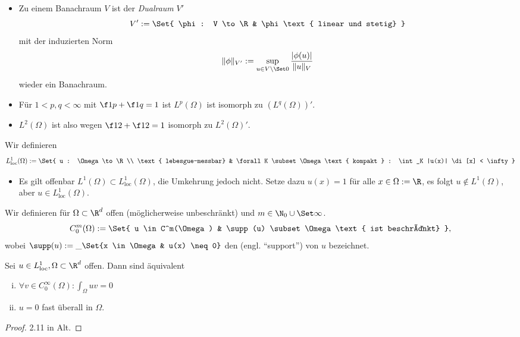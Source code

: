 \begin{df}[$L^p$-Räume]
\begin{note}
\begin{itemize}
			\item
				Zu einem Banachraum $V$ ist der \emph{Dualraum} $V'$
				\[
					V' := \Set{ \phi: V \to \R & \phi \text{ linear und stetig} }
				\]
				mit der induzierten Norm
				\[
					\|\phi\|_{V'} := \sup_{u\in V\setminus \Set 0} \frac{|\phi(u)|}{\|u\|_V}
				\]
				wieder ein Banachraum.
			\item
				Für $1 < p,q < \infty$ mit $\f 1p + \f 1q = 1$ ist $L^p(\Omega)$ ist isomorph zu $(L^q(\Omega))'$.
			\item
				$L^2(\Omega)$ ist also wegen $\f 12 + \f 12 = 1$ isomorph zu $L^2(\Omega)'$.
		\end{itemize}
	\end{note}
\end{df}

\begin{df} \label{1.5}
	Wir definieren
	\[
		L^1_{\text{loc}}(\Omega) :=
		\Set{ u : \Omega \to \R \\ \text{ lebesgue-messbar} & \forall  K \subset \Omega \text{ kompakt } : \int_K |u(x)| \di[x] < \infty }
	\]
\end{df}

\begin{ex*}
	\begin{itemize}
		\item
			Es gilt offenbar $L^1(\Omega) \subset L^1_{\text{loc}}(\Omega)$,
			die Umkehrung jedoch nicht.
			Setze dazu $u(x) = 1$ für alle $x \in \Omega := \R$,
			es folgt $u \not\in L^1(\Omega)$, aber $u \in L^1_{\text{loc}}(\Omega)$.
	\end{itemize}
\end{ex*}

\begin{df} \label{1.6}
	Wir definieren für $\Omega \subset \R^d$ offen (möglicherweise unbeschränkt) und $m \in \N_0 \cup \Set \infty$.
	\[
		C_0^m(\Omega)
		:= \Set{ u \in C^m(\Omega) & \supp(u) \subset \Omega \text{ ist beschränkt} },
	\]
	wobei $\supp(u) := \_{\Set{x \in \Omega & u(x) \neq 0}}$ den  (engl. “support”) von $u$ bezeichnet.
\end{df}

\begin{st} \label{1.7}
	Sei $u \in L^1_{\text{loc}}, \Omega \subset \R^d$ offen. Dann sind äquivalent
	\begin{enumerate}[i)]
		\item
			$\forall v \in C_0^\infty(\Omega) : \int_\Omega uv = 0$
		\item
			$u = 0$ fast überall in $\Omega$.
	\end{enumerate}
	\begin{proof}
		2.11 in Alt.
	\end{proof}
\end{st}

